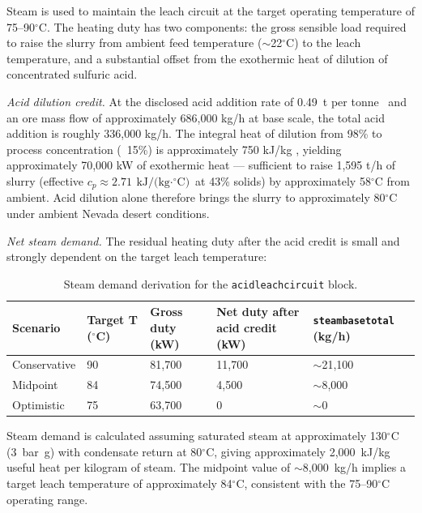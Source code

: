 \documentclass{article}
\renewcommand\_{\textunderscore\allowbreak}
\begin{document}
Steam is used to maintain the leach circuit at the target operating temperature of 75--90$^\circ$C. The heating duty has two components: the gross sensible load required to raise the slurry from ambient feed temperature ($\sim$22$^\circ$C) to the leach temperature, and a substantial offset from the exothermic heat of dilution of concentrated sulfuric acid.

\textit{Acid dilution credit.} At the disclosed acid addition rate of 0.49~t  per tonne~\cite{sgscanadaincSK1300Technical2024} and an ore mass flow of approximately 686,000 \si{kg/h} at base scale, the total acid addition is roughly 336,000 \si{kg/h}. The integral heat of dilution from 98\% to process concentration (~15\%) is approximately 750 \si{kJ/kg} , yielding approximately 70,000 kW of exothermic heat --- sufficient to raise 1,595 \si{t/h} of slurry (effective $c_p \approx 2.71~\text{kJ/(kg$\cdot^\circ$C)}$ at 43\% solids) by approximately 58$^\circ$C from ambient. Acid dilution alone therefore brings the slurry to approximately 80$^\circ$C under ambient Nevada desert conditions.

\textit{Net steam demand.} The residual heating duty after the acid credit is small and strongly dependent on the target leach temperature:

\begin{table}[h!]
\caption{Steam demand derivation for the \texttt{acid\_leach\_circuit} block.}
\centering
\begin{tabular}{lp{2cm}p{2.3cm}p{3.5cm}p{3cm}}
\toprule
\textbf{Scenario} & \textbf{Target T ($^\circ$C)} & \textbf{Gross duty (kW)} & \textbf{Net duty after acid credit (kW)} & \texttt{steam\_base\_total} \textbf{(kg/h)} \\
\midrule
Conservative & 90 & 81,700 & 11,700 & $\sim$21,100 \\
Midpoint     & 84 & 74,500 &  4,500 & $\sim$8,000  \\
Optimistic   & 75 & 63,700 &      0 & $\sim$0      \\
\bottomrule
\end{tabular}
\end{table}

\noindent Steam demand is calculated assuming saturated steam at approximately 130$^\circ$C (3~bar~g) with condensate return at 80$^\circ$C, giving approximately 2,000~kJ/kg useful heat per kilogram of steam. The midpoint value of $\sim$8,000~kg/h implies a target leach temperature of approximately 84$^\circ$C, consistent with the 75--90$^\circ$C operating range.
\end{document}
